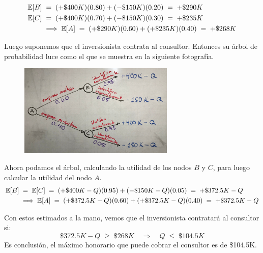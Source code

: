 \documentclass[ a4paper, twoside, 11pt]{article}
\begin{document}
\begin{problem}
\begin{align*}
\mathbb{E}[B] \; 
& = \; (+\$400K)(0.80) + (-\$150K)(0.20) \; = \; +\$290K \\
\mathbb{E}[C] \; 
& = \; (+\$400K)(0.70) + (-\$150K)(0.30) \; = \; +\$235K \\
& \Longrightarrow \; \mathbb{E}[A] \; = \;
(+\$290K)(0.60) + (+\$235K)(0.40) \; = \; +\$268K
\end{align*}

Luego suponemos que el inversionista contrata al consultor. Entonces su \'arbol de probabilidad luce como el que se muestra en la siguiente fotograf\'ia. 
\begin{figure}[H]
\centering
\includegraphics[width=0.66\textwidth]{Problema-3B2.jpg}
\end{figure}
Ahora podamos el \'arbol, calculando la utilidad de los nodos $B$ y $C$, para luego calcular la utilidad del nodo $A$. 
\begin{align*}
\mathbb{E}[B] \; 
& = \; \mathbb{E}[C] \; = \; (+\$400K-Q)(0.95) + (-\$150K-Q)(0.05) \; = \; +\$372.5K - Q \\
& \Longrightarrow \; \mathbb{E}[A] \; = \;
(+\$372.5K - Q)(0.60) + (+\$372.5K - Q)(0.40) \; = \; +\$372.5K - Q
\end{align*}

Con estos estimados a la mano, vemos que el inversionista contratar\'a al consultor si: 
\[
\$372.5K - Q \; \geq \; \$268K \quad \Longrightarrow \quad
Q \; \leq \; \$104.5K
\]
Es conclusi\'on, el m\'aximo honorario que puede cobrar el consultor es de \$104.5K. 
\QED

\end{problem}
\fullskip
\end{document}
